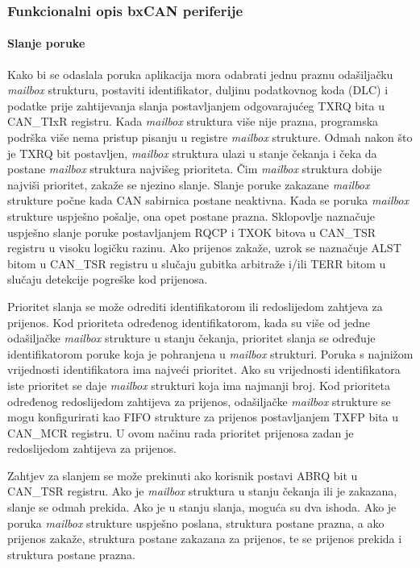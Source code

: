 \subsubsection{Funkcionalni opis bxCAN periferije}

\paragraph{Slanje poruke}

Kako bi se odaslala poruka aplikacija mora odabrati jednu praznu odašiljačku \textit{mailbox} strukturu, postaviti identifikator, duljinu podatkovnog koda (DLC) i podatke prije zahtijevanja slanja postavljanjem odgovarajućeg TXRQ bita u CAN\_TIxR registru. Kada \textit{mailbox} struktura više nije prazna, programska podrška više nema pristup pisanju u registre \textit{mailbox} strukture. Odmah nakon što je TXRQ bit postavljen, \textit{mailbox} struktura ulazi u stanje čekanja i čeka da postane \textit{mailbox} struktura najvišeg prioriteta. Čim \textit{mailbox} struktura dobije najviši prioritet, zakaže se njezino slanje. Slanje poruke zakazane \textit{mailbox} strukture počne kada CAN sabirnica postane neaktivna. Kada se poruka \textit{mailbox} strukture uspješno pošalje, ona opet postane prazna. Sklopovlje naznačuje uspješno slanje poruke postavljanjem RQCP i TXOK bitova u CAN\_TSR registru u visoku logičku razinu. Ako prijenos zakaže, uzrok se naznačuje ALST bitom u CAN\_TSR registru u slučaju gubitka arbitraže i/ili TERR bitom u slučaju detekcije pogreške kod prijenosa.

Prioritet slanja se može odrediti identifikatorom ili redoslijedom zahtjeva za prijenos. Kod prioriteta određenog identifikatorom, kada su više od jedne odašiljačke \textit{mailbox} strukture u stanju čekanja, prioritet slanja se određuje identifikatorom poruke koja je pohranjena u \textit{mailbox} strukturi. Poruka s najnižom vrijednosti identifikatora ima najveći prioritet. Ako su vrijednosti identifikatora iste prioritet se daje \textit{mailbox} strukturi koja ima najmanji broj. Kod prioriteta određenog redoslijedom zahtijeva za prijenos, odašiljačke \textit{mailbox} strukture se mogu konfigurirati kao FIFO strukture za prijenos postavljanjem TXFP bita u CAN\_MCR registru. U ovom načinu rada prioritet prijenosa zadan je redoslijedom zahtijeva za prijenos.

Zahtjev za slanjem se može prekinuti ako korisnik postavi ABRQ bit u CAN\_TSR registru. Ako je \textit{mailbox} struktura u stanju čekanja ili je zakazana, slanje se odmah prekida. Ako je u stanju slanja, moguća su dva ishoda. Ako je poruka \textit{mailbox} strukture uspješno poslana, struktura postane prazna, a ako prijenos zakaže, struktura postane zakazana za prijenos, te se prijenos prekida i struktura postane prazna.

